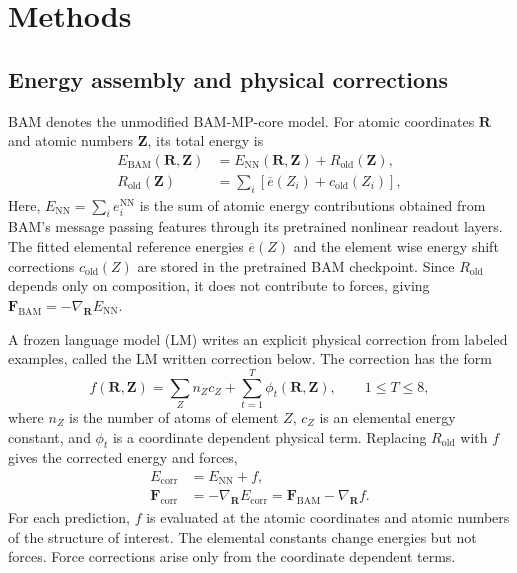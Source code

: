 \section{Methods}

\subsection{Energy assembly and physical corrections}

BAM denotes the unmodified BAM-MP-core model. For atomic coordinates $\mathbf R$ and atomic numbers $\mathbf Z$, its total energy is
\begin{equation}
\begin{aligned}
E_{\mathrm{BAM}}(\mathbf R,\mathbf Z)&=E_{\mathrm{NN}}(\mathbf R,\mathbf Z)+R_{\mathrm{old}}(\mathbf Z),\\
R_{\mathrm{old}}(\mathbf Z)&=\sum_i\left[\overline e(Z_i)+c_{\mathrm{old}}(Z_i)\right],
\end{aligned}
\label{eq:bam}
\end{equation}
Here, $E_{\mathrm{NN}}=\sum_i e_i^{\mathrm{NN}}$ is the sum of atomic energy contributions obtained from BAM's message passing features through its pretrained nonlinear readout layers. The fitted elemental reference energies $\overline e(Z)$ and the element wise energy shift corrections $c_{\mathrm{old}}(Z)$ are stored in the pretrained BAM checkpoint. Since $R_{\mathrm{old}}$ depends only on composition, it does not contribute to forces, giving $\mathbf F_{\mathrm{BAM}}=-\nabla_{\mathbf R}E_{\mathrm{NN}}$.

A frozen language model (LM) writes an explicit physical correction from labeled examples, called the LM written correction below. The correction has the form
\begin{equation}
f(\mathbf R,\mathbf Z)=\sum_Z n_Zc_Z+\sum_{t=1}^{T}\phi_t(\mathbf R,\mathbf Z),\qquad 1\leq T\leq8,
\label{eq:f}
\end{equation}
where $n_Z$ is the number of atoms of element $Z$, $c_Z$ is an elemental energy constant, and $\phi_t$ is a coordinate dependent physical term. Replacing $R_{\mathrm{old}}$ with $f$ gives the corrected energy and forces,
\begin{equation}
\begin{aligned}
E_{\mathrm{corr}}&=E_{\mathrm{NN}}+f,\\
\mathbf F_{\mathrm{corr}}&=-\nabla_{\mathbf R}E_{\mathrm{corr}}=\mathbf F_{\mathrm{BAM}}-\nabla_{\mathbf R}f.
\end{aligned}
\label{eq:new}
\end{equation}
For each prediction, $f$ is evaluated at the atomic coordinates and atomic numbers of the structure of interest. The elemental constants change energies but not forces. Force corrections arise only from the coordinate dependent terms.

